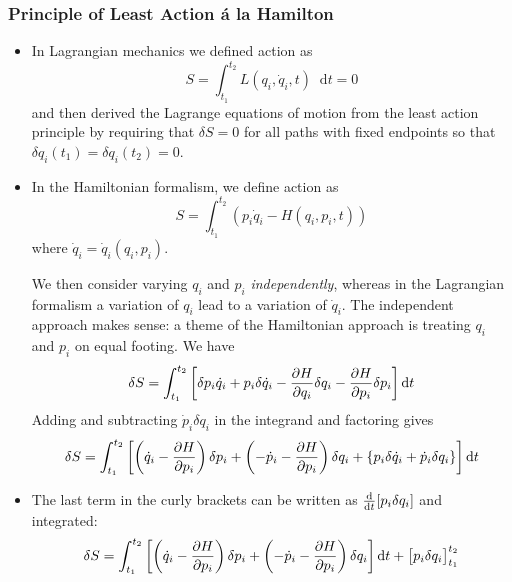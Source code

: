 \documentclass[11pt, a4paper]{article}
\newcommand{\diff}{\mathop{}\!\mathrm{d}} %
\begin{document}
\subsubsection{Principle of Least Action \'{a} la Hamilton}
\begin{itemize}
	\item In Lagrangian mechanics we defined action as 
	\begin{equation*}
		S = \int_{t_{1}}^{t_{2}} L(q_{i}, \dot{q}_{i}, t) \diff t = 0
	\end{equation*}
	and then derived the Lagrange equations of motion from the least action principle by requiring that $ \delta S = 0 $ for all paths with fixed endpoints so that $ \delta q_{i}(t_{1}) = \delta q_{i}(t_{2}) = 0 $.
	
	\item In the Hamiltonian formalism, we define action as
	\begin{equation*}
		S = \int_{t_{1}}^{t_{2}}(p_{i}\dot{q}_{i} - H(q_{i}, p_{i}, t))
	\end{equation*}
	where $ \dot{q}_{i} = \dot{q}_{i}(q_{i}, p_{i}) $.
	
	We then consider varying $ q_{i} $ and $ p_{i} $ \textit{independently}, whereas in the Lagrangian formalism a variation of $ q_{i} $ lead to a variation of $ \dot{q}_{i} $. The independent approach makes sense: a theme of the Hamiltonian approach is treating $ q_{i} $ and $ p_{i} $ on equal footing. We have
	\begin{equation*}
		\delta S = \int_{t_{1}}^{t_{2}} \left[\delta p_{i} \dot{q}_{i} + p_{i} \delta \dot{q}_{i} - \pdv{H}{q_{i}}\delta q_{i} - \pdv{H}{p_{i}}\delta p_{i}\right] \diff t
	\end{equation*}
	Adding and subtracting $ \dot{p}_{i}\delta q_{i} $ in the integrand and factoring gives
	\begin{equation*}
			\delta S = \int_{t_{1}}^{t_{2}} \left[\left(\dot{q}_{i} - \pdv{H}{p_{i}}\right)\delta p_{i} + \left(-\dot{p}_{i} - \pdv{H}{p_{i}}\right)\delta q_{i} +  \{ p_{i}\delta \dot{q}_{i} + \dot{p}_{i} \delta q_{i}  \} \right] \diff t
	\end{equation*}
	
	\item The last term in the curly brackets can be written as $ \dv{}{t}[p_{i}\delta q_{i}] $ and integrated:
	\begin{equation*}
		\delta S = \int_{t_{1}}^{t_{2}} \left[\left(\dot{q}_{i} - \pdv{H}{p_{i}}\right)\delta p_{i} + \left(-\dot{p}_{i} - \pdv{H}{p_{i}}\right)\delta q_{i} \right] \diff t + \big[p_{i}\delta q_{i} \big]_{t_{1}}^{t_{2}}
	\end{equation*}
	

\end{itemize}
\end{document}
